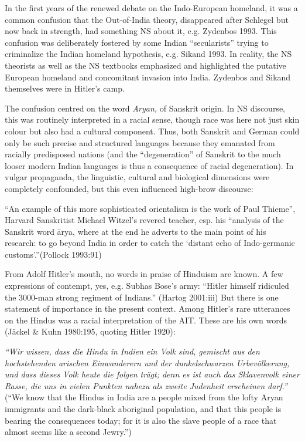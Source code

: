 In the first years of the renewed debate on the Indo-European homeland, it was a common confusion that the Out-of-India theory, disappeared after Schlegel but now back in strength, had something NS about it, e.g. Zydenbos 1993. This confusion was deliberately fostered by some Indian “secularists” trying to criminalize the Indian homeland hypothesis, e.g. Sikand 1993. In reality, the NS theorists as well as the NS textbooks emphasized and highlighted the putative European homeland and concomitant invasion into India. Zydenbos and Sikand themselves were in Hitler’s camp.

The confusion centred on the word {\sl Aryan,} of Sanskrit origin. In NS discourse, this was routinely interpreted in a racial sense, though race was here not just skin colour but also had a cultural component. Thus, both Sanskrit and German could only be such precise and structured languages because they emanated from racially predisposed nations (and the “degeneration” of Sanskrit to the much looser modern Indian languages is thus a consequence of racial degeneration). In vulgar propaganda, the linguistic, cultural and biological dimensions were completely confounded, but this even influenced high-brow discourse: 
\begin{myquote}
“An example of this more sophisticated orientalism is the work of Paul Thieme”, Harvard Sanskritist Michael Witzel’s revered teacher, esp. his “analysis of the Sanskrit word ārya, where at the end he adverts to the main point of his research: to go beyond India in order to catch the ‘distant echo of Indo-germanic customs’.”\hfill (Pollock 1993:91)
\end{myquote}

From Adolf Hitler’s mouth, no words in praise of Hinduism are known. A few expressions of contempt, yes, e.g. Subhas Bose’s army: “Hitler himself ridiculed the 3000-man strong regiment of Indians.” (Hartog 2001:iii) But there is one statement of importance in the present context. Among Hitler’s rare utterances on the Hindus was a racial interpretation of the AIT\@. These are his own words (Jäckel \& Kuhn 1980:195, quoting Hitler 1920): 
\begin{myquote}
{\sl “Wir wissen, dass die Hindu in Indien ein Volk sind, gemischt aus den hochstehenden arischen Einwanderern und der dunkelschwarzen Urbevölkerung, und dass dieses Volk heute die folgen trägt; denn es ist auch das Sklavenvolk einer Rasse, die uns in vielen Punkten nahezu als zweite Judenheit erscheinen darf.”}
(“We know that the Hindus in India are a people mixed from the lofty Aryan immigrants and the dark-black aboriginal population, and that this people is bearing the consequences today; for it is also the slave people of a race that almost seems like a second Jewry.”)
\end{myquote}

